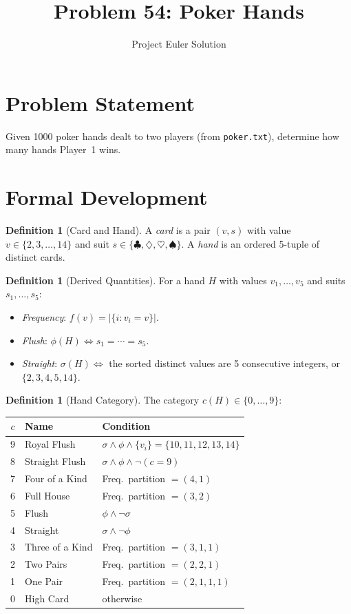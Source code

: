 \documentclass[12pt]{article}
\title{Problem 54: Poker Hands}
\author{Project Euler Solution}
\date{}
\theoremstyle{definition}
\newtheorem{definition}[theorem]{Definition}
\begin{document}
\maketitle

\section{Problem Statement}
Given 1000 poker hands dealt to two players (from \texttt{poker.txt}), determine how many hands Player~1 wins.

\section{Formal Development}

\begin{definition}[Card and Hand]
A \emph{card} is a pair $(v, s)$ with value $v \in \{2, 3, \ldots, 14\}$ and suit $s \in \{\clubsuit, \diamondsuit, \heartsuit, \spadesuit\}$. A \emph{hand} is an ordered 5-tuple of distinct cards.
\end{definition}

\begin{definition}[Derived Quantities]
For a hand $H$ with values $v_1, \ldots, v_5$ and suits $s_1, \ldots, s_5$:
\begin{itemize}
    \item \emph{Frequency}: $f(v) = |\{i : v_i = v\}|$.
    \item \emph{Flush}: $\phi(H) \iff s_1 = \cdots = s_5$.
    \item \emph{Straight}: $\sigma(H) \iff$ the sorted distinct values are 5 consecutive integers, or $\{2,3,4,5,14\}$.
\end{itemize}
\end{definition}

\begin{definition}[Hand Category]
The category $c(H) \in \{0, \ldots, 9\}$:
\begin{center}
\begin{tabular}{cll}
\toprule
$c$ & Name & Condition \\
\midrule
9 & Royal Flush & $\sigma \wedge \phi \wedge \{v_i\} = \{10,11,12,13,14\}$ \\
8 & Straight Flush & $\sigma \wedge \phi \wedge \neg(c=9)$ \\
7 & Four of a Kind & Freq.\ partition $= (4,1)$ \\
6 & Full House & Freq.\ partition $= (3,2)$ \\
5 & Flush & $\phi \wedge \neg\sigma$ \\
4 & Straight & $\sigma \wedge \neg\phi$ \\
3 & Three of a Kind & Freq.\ partition $= (3,1,1)$ \\
2 & Two Pairs & Freq.\ partition $= (2,2,1)$ \\
1 & One Pair & Freq.\ partition $= (2,1,1,1)$ \\
0 & High Card & otherwise \\
\bottomrule
\end{tabular}
\end{center}
\end{definition}
\end{document}

